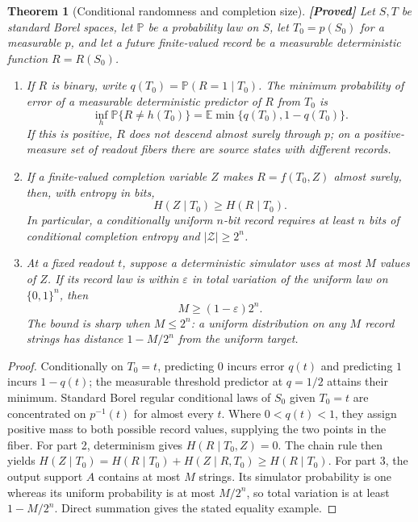 \documentclass[11pt,a4paper]{article}
\newtheorem{theorem}{Theorem}[section]
\theoremstyle{definition}
\theoremstyle{remark}\newtheorem{remark}[theorem]{Remark}
\newcommand{\status}[1]{\textbf{[#1]}\quad}
\newcommand{\Prb}{\mathbb P}
\newcommand{\E}{\mathbb E}
\begin{document}
\begin{theorem}[Conditional randomness and completion size]
\label{op:information}
\status{Proved}
Let $S,T$ be standard Borel spaces, let $\Prb$ be a probability law on
$S$, let $T_0=p(S_0)$ for a measurable $p$, and let a future finite-valued
record be a measurable deterministic function $R=R(S_0)$.
\begin{enumerate}
\item If $R$ is binary, write $q(T_0)=\Prb(R=1\mid T_0)$. The minimum
probability of error of a measurable deterministic predictor of $R$ from
$T_0$ is
\[
 \inf_h\Prb\{R\ne h(T_0)\}
 =\E\min\{q(T_0),1-q(T_0)\}.
\]
If this is positive, $R$ does not descend almost surely through $p$;
on a positive-measure set of readout fibers there are source states with
different records.
\item If a finite-valued completion variable $Z$ makes $R=f(T_0,Z)$
almost surely, then, with entropy in bits,
\[
 H(Z\mid T_0)\ge H(R\mid T_0).
\]
In particular, a conditionally uniform $n$-bit record requires at least
$n$ bits of conditional completion entropy and $|\mathcal Z|\ge2^n$.
\item At a fixed readout $t$, suppose a deterministic simulator uses at
most $M$ values of $Z$. If its record law is within $\varepsilon$ in
total variation of the uniform law on $\{0,1\}^n$, then
\[
 M\ge(1-\varepsilon)2^n.
\]
The bound is sharp when $M\le2^n$: a uniform distribution on any
$M$ record strings has distance $1-M/2^n$ from the uniform target.
\end{enumerate}
\end{theorem}

\begin{proof}
Conditionally on $T_0=t$, predicting $0$ incurs error $q(t)$ and
predicting $1$ incurs $1-q(t)$; the measurable threshold predictor at
$q=1/2$ attains their minimum. Standard Borel regular conditional laws
of $S_0$ given $T_0=t$ are concentrated on $p^{-1}(t)$ for almost every
$t$. Where $0<q(t)<1$, they assign positive mass to both possible record
values, supplying the two points in the fiber. For part 2, determinism
gives $H(R\mid T_0,Z)=0$. The chain rule then yields
$H(Z\mid T_0)=H(R\mid T_0)+H(Z\mid R,T_0)\ge H(R\mid T_0)$.
For part 3, the output support $A$ contains at most $M$ strings. Its
simulator probability is one whereas its uniform probability is at most
$M/2^n$, so total variation is at least $1-M/2^n$. Direct summation gives
the stated equality example.
\end{proof}
\end{document}
